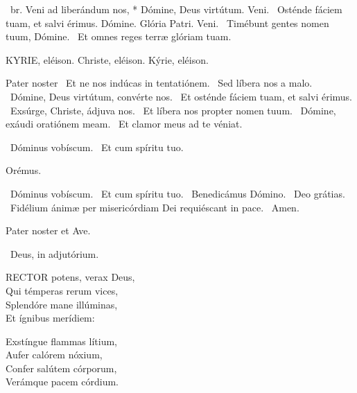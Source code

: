 
\R\ br. Veni ad liberándum nos, * Dómine, Deus virtútum. Veni. \V\ Osténde fáciem tuam, et salvi érimus. Dómine. Glória Patri. Veni. \V\ Timébunt gentes nomen tuum, Dómine. \R\ Et omnes reges terræ glóriam tuam.



KYRIE, eléison. Christe, eléison. Kýrie, eléison.

Pater noster  \V\ Et ne nos indúcas in tentatiónem. \R\ Sed líbera nos a malo. \V\ Dómine, Deus virtútum, convérte nos. \R\ Et osténde fáciem tuam, et salvi érimus. \V\ Exsúrge, Christe, ádjuva nos. \R\ Et líbera nos propter nomen tuum. \V\ Dómine, exáudi oratiónem meam. \R\ Et clamor meus ad te véniat.


\V\ Dóminus vobíscum. \R\ Et cum spíritu tuo.

Orémus.


\V\ Dóminus vobíscum. \R\ Et cum spíritu tuo. \V\ Benedicámus Dómino. \R\ Deo grátias. \V\ Fidélium ánimæ per misericórdiam Dei requiéscant in pace. \R\ Amen.


\sectionornament


Pater noster et Ave.

\V\ Deus, in adjutórium.


\lettrine[lines=2]{R}{ECTOR} potens, verax Deus,\\
Qui témperas rerum vices,\\
Splendóre mane illúminas,\\
Et ígnibus merídiem:

Exstíngue flammas lítium,\\
Aufer calórem nóxium,\\
Confer salútem córporum,\\
Verámque pacem córdium.

